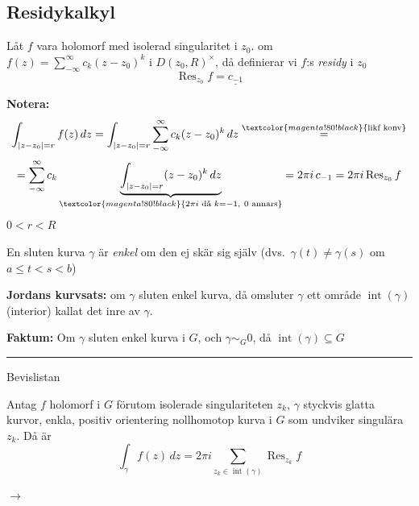 \subsection{Residykalkyl}
\begin{definition}
Låt $f$ vara holomorf med isolerad singularitet i $z_0$. om $f(z) = \sum_{-\infty}^\infty c_k(z - z_0)^k$ i \emph{$D(z_0, R)^\times$}, då definierar vi $f$:s \emph{residy} i $z_0$
\[ \operatorname{Res}_{z_0} f = \underline{c_{-1}} \]
\end{definition}

\textcolor{red!70!black}{\textbf{Notera:}}
\[ \int_{|z - z_0| = r} f(z)\,dz = \int_{|z - z_0| = r} \sum_{-\infty}^\infty c_k(z - z_0)^k\,dz \overset{\textcolor{magenta!80!black}{\text{likf konv}}}{=} \]
\[ = \sum_{-\infty}^\infty c_k \underbrace{\int_{|z - z_0| = r} (z - z_0)^k\,dz}_{\textcolor{magenta!80!black}{2\pi i \text{ då } k = -1,\ 0 \text{ annars}}} = 2\pi i\, c_{-1} = 2\pi i \operatorname{Res}_{z_0} f \]
\hfill $0 < r < R$

\begin{definition}
En sluten kurva $\gamma$ är \emph{enkel} om den ej skär sig själv (dvs.\ $\gamma(t) \neq \gamma(s)$ om $a \le t < s < b$)
\end{definition}

\textbf{Jordans kurvsats:} om $\gamma$ sluten enkel kurva, då omsluter $\gamma$ ett område $\operatorname{int}(\gamma)$ \textcolor{magenta!80!black}{(interior)} kallat det inre av $\gamma$.

\textcolor{red!70!black}{\textbf{Faktum:}} Om $\gamma$ sluten enkel kurva i $G$, och $\gamma \sim_G 0$, då $\operatorname{int}(\gamma) \subseteq G$

\noindent\rule{\linewidth}{0.4pt}

\begin{theorem}
\hfill \textcolor{magenta!80!black}{Bevislistan}

Antag $f$ holomorf i $G$ förutom isolerade singulariteten $z_k$, $\gamma$ styckvis glatta kurvor, enkla, positiv orientering nollhomotop kurva i $G$ som undviker singulära $z_k$. Då är
\[ \int_\gamma f(z)\,dz = 2\pi i \sum_{z_k \in \operatorname{int}(\gamma)} \operatorname{Res}_{z_k} f \]
\end{theorem}

\hfill \textcolor{red!70!black}{} $\longrightarrow$
